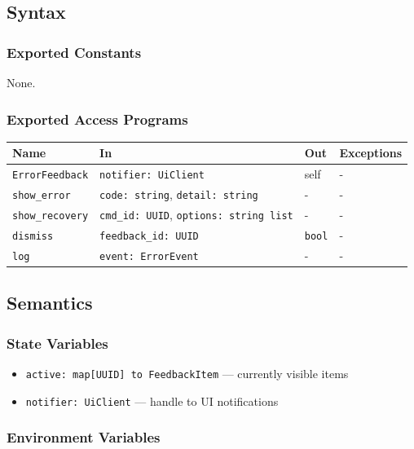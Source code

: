 \documentclass[12pt, titlepage]{article}
\begin{document}
\subsection{Syntax}

\subsubsection{Exported Constants}

None.

\subsubsection{Exported Access Programs}

\begin{center}
\begin{tabular}{|l|l|l|l|}
\hline
\textbf{Name} & \textbf{In} & \textbf{Out} & \textbf{Exceptions} \\
\hline
\texttt{ErrorFeedback} & \texttt{notifier: UiClient} & self & - \\
\texttt{show\_error} & \texttt{code: string}, \texttt{detail: string} & - & - \\
\texttt{show\_recovery} & \texttt{cmd\_id: UUID}, \texttt{options: string list} & - & - \\
\texttt{dismiss} & \texttt{feedback\_id: UUID} & \texttt{bool} & - \\
\texttt{log} & \texttt{event: ErrorEvent} & - & - \\
\hline
\end{tabular}
\end{center}

\subsection{Semantics}

\subsubsection{State Variables}

\begin{itemize}
  \item \texttt{active: map[UUID] to FeedbackItem} — currently visible items
  \item \texttt{notifier: UiClient} — handle to UI notifications
\end{itemize}

\subsubsection{Environment Variables}
\end{document}
